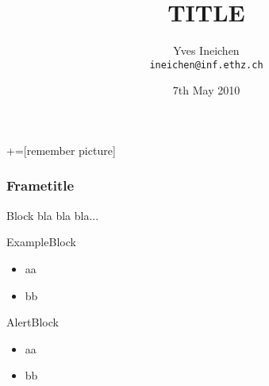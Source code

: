 \documentclass[xcolor=pdftex,table,10pt]{beamer}
\title[SHORT]{TITLE}
\author[Yves Ineichen]{Yves Ineichen \\ \texttt{ineichen@inf.ethz.ch}}
\institute{Institute}
\date{7th May 2010}
\begin{document}
+=[remember picture]

\everymath{\displaystyle}

\lstset{language=C++, basicstyle=\small}


\begin{frame}
    \titlepage
\end{frame}


\begin{frame}
\frametitle{Frametitle}

    \begin{block}{Block}
        bla bla bla...
    \end{block}

    \vspace{0.1cm}
    
    \begin{exampleblock}{ExampleBlock}
        \begin{itemize}
            \item aa
            \item bb
        \end{itemize}
    \end{exampleblock}
    
    \vspace{0.1cm}

    \begin{alertblock}{AlertBlock}  
    \begin{itemize}
        \item aa 
        \item bb
    \end{itemize}
    \end{alertblock}

\end{frame}
\end{document}
